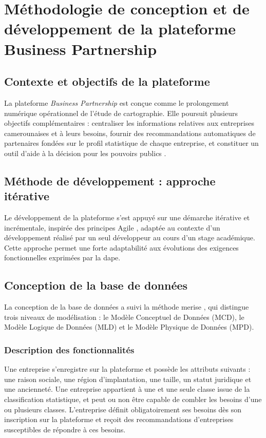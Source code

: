 \documentclass[12pt, a4paper, oneside]{report}
\begin{document}
\section{Méthodologie de conception et de développement de la plateforme Business Partnership}
\label{sec:methodologie_dev}

\subsection{Contexte et objectifs de la plateforme}

La plateforme \textit{Business Partnership} est conçue comme le prolongement numérique opérationnel de l'étude de cartographie. Elle poursuit plusieurs objectifs complémentaires : centraliser les informations relatives aux entreprises camerounaises et à leurs besoins, fournir des recommandations automatiques de partenaires fondées sur le profil statistique de chaque entreprise, et constituer un outil d'aide à la décision pour les pouvoirs publics \cite{minepat2025}.

\subsection{Méthode de développement : approche itérative}

Le développement de la plateforme s'est appuyé sur une démarche itérative et incrémentale, inspirée des principes Agile \cite{beck2001}, adaptée au contexte d'un développement réalisé par un seul développeur au cours d'un stage académique. Cette approche permet une forte adaptabilité aux évolutions des exigences fonctionnelles exprimées par la \gls{dape}.

\subsection{Conception de la base de données}

La conception de la base de données a suivi la méthode \gls{merise} \cite{tardieu1983}, qui distingue trois niveaux de modélisation : le Modèle Conceptuel de Données (MCD), le Modèle Logique de Données (MLD) et le Modèle Physique de Données (MPD).

\subsubsection{Description des fonctionnalités}

Une entreprise s'enregistre sur la plateforme et possède les attributs suivants : une raison sociale, une région d'implantation, une taille, un statut juridique et une ancienneté. Une entreprise appartient à une et une seule classe issue de la classification statistique, et peut ou non être capable de combler les besoins d'une ou plusieurs classes. L'entreprise définit obligatoirement ses besoins dès son inscription sur la plateforme et reçoit des recommandations d'entreprises susceptibles de répondre à ces besoins.
\end{document}

